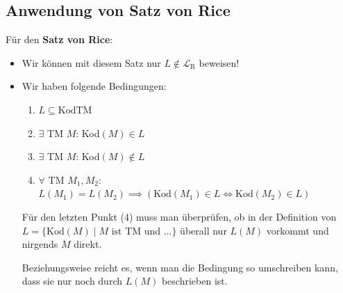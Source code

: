 \documentclass[a4paper, 11pt]{article}
\def\L{\mathcal{L}}
\begin{document}
                \subsection{Anwendung von Satz von Rice}
                    Für den \textbf{Satz von Rice}:
                    \begin{itemize}[label=-]
                        \item Wir können mit diesem Satz nur $L \notin \L_{\text{R}}$ beweisen!
                        \item Wir haben folgende Bedingungen:
                        \begin{enumerate}[label=\roman*.]
                            \item $L \subseteq \text{KodTM}$
                            \item $\exists$ TM $M$: Kod$(M) \in L$
                            \item $\exists$ TM $M$: Kod$(M) \notin L$
                            \item $\forall$ TM $M_1, M_2$: $L(M_1) = L(M_2) \implies \left(\text{Kod}(M_1) \in L \iff \text{Kod}(M_2) \in L\right)$
                        \end{enumerate}
                        Für den letzten Punkt (4) muss man überprüfen, ob in der Definition von $L = \{\text{Kod}(M) \mid M \text{ ist TM und ...}\}$ überall nur $L(M)$ vorkommt und nirgends $M$ direkt. 
                        
                        Beziehungsweise reicht es, wenn man die Bedingung so umschreiben kann, dass sie nur noch durch $L(M)$ beschrieben ist.
                    \end{itemize}
                
                
                
\end{document}
